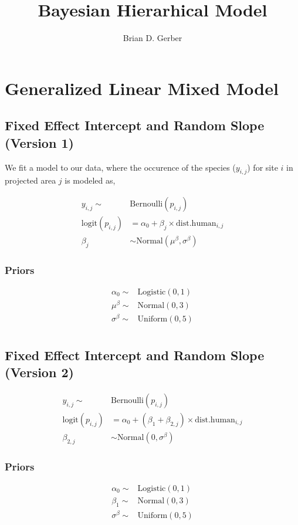 \documentclass[12pt]{article}
\title{Bayesian Hierarhical Model}
\author{Brian D. Gerber}
\begin{document}
\maketitle
\section{Generalized Linear Mixed Model}
\subsection{Fixed Effect Intercept and Random Slope (Version 1)}

\Large

We fit a model to our data, where the occurence of the species ($y_{i,j}$) for site $i$ in projected area $j$ is modeled as,

\begin{align*}
y_{i,j}\sim& \text{Bernoulli}(p_{i,j})\\
\text{logit}(p_{i,j}) &= \alpha_{0} + \beta_{j}\times \text{dist.human}_{i,j}\\
\beta_{j} &\sim \text{Normal}(\mu^{\beta}, \sigma^{\beta})
\end{align*}

\subsubsection{Priors}

\begin{align*}
\alpha_{0} \sim& \text{Logistic}(0, 1)\\
\mu^{\beta} \sim& \text{Normal}(0, 3)\\
\sigma^{\beta} \sim& \text{Uniform}(0, 5)\\
\end{align*}


\pagebreak

\subsection{Fixed Effect Intercept and Random Slope (Version 2)}



\begin{align*}
y_{i,j}\sim& \text{Bernoulli}(p_{i,j})\\
\text{logit}(p_{i,j}) &= \alpha_{0} + (\beta_1 + \beta_{2,j}) \times \text{dist.human}_{i,j}\\
\beta_{2,j} &\sim \text{Normal}(0, \sigma^{\beta})
\end{align*}

\subsubsection{Priors}

\begin{align*}
\alpha_{0} \sim& \text{Logistic}(0, 1)\\
\beta_{1} \sim& \text{Normal}(0, 3)\\
\sigma^{\beta} \sim& \text{Uniform}(0, 5)\\
\end{align*}
\end{document}
